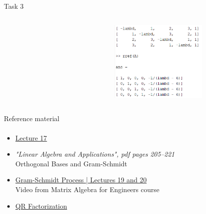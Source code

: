 \documentclass[aspectratio=169]{beamer}
\begin{document}
\begin{frame}[t]{Task 3}
{\begin{columns}[T,onlytextwidth]
\begin{column}{0.64\textwidth}
            \end{column}
            \begin{column}{0.35\textwidth}
                \vspace{-0.3cm}
                \begin{figure}[H]
                    \centering\includegraphics[height=4cm,width=1\textwidth,keepaspectratio]{task3_ans.png}
                    \label{fig:task3_ans.png}
                \end{figure}
            \end{column}
        \end{columns}

    }
\end{frame}

\begin{frame}[t]{Reference material}
    \framesubtitle{}
    \Large
    \begin{itemize}
        \item \href{https://www.youtube.com/watch?v=Y_Ac6KiQ1t0&list=PL49CF3715CB9EF31D&index=17}{Lecture 17}
        \item \textit{"Linear Algebra and Applications", pdf pages 205--221 }\\ Orthogonal Bases and Gram-Schmidt
        \item \href{https://www.youtube.com/watch?v=eib8uAlzegc&list=PLkZjai-2Jcxlg-Z1roB0pUwFU-P58tvOx&index=20}{Gram-Schmidt Process | Lectures 19 and 20}\\ Video from Matrix Algebra for Engineers course
        \item \href{https://www.youtube.com/watch?v=J41Ypt6Mftc}{QR Factorization}
    \end{itemize}
\end{frame}
\end{document}
